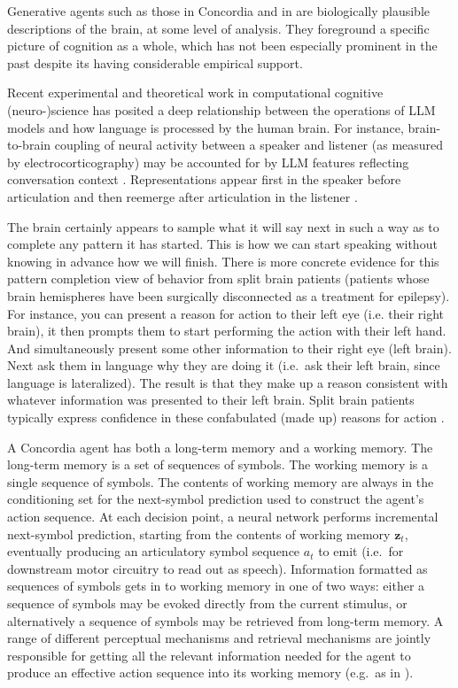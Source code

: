 \documentclass[11pt, a4paper, logo, twocolumn, internal, copyright, numbering]{googledeepmind}
\begin{document}
Generative agents such as those in Concordia and in \cite{park2023generative} are biologically plausible descriptions of the brain, at some level of analysis. They foreground a specific picture of cognition as a whole, which has not been especially prominent in the past despite its having considerable empirical support.

Recent experimental \citep{goldstein2022shared, schrimpf2020artificial} and theoretical \citep{linzen2021syntactic, mcclelland2020placing} work in computational cognitive (neuro-)science has posited a deep relationship between the operations of LLM models and how language is processed by the human brain. For instance, brain-to-brain coupling of neural activity between a speaker and listener (as measured by electrocorticography) may be accounted for by LLM features reflecting conversation context \citep{goldstein2022shared}. Representations appear first in the speaker before articulation and then reemerge after articulation in the listener \citep{zada2023shared}.

The brain certainly appears to sample what it will say next in such a way as to complete any pattern it has started. This is how we can start speaking without knowing in advance how we will finish. There is more concrete evidence for this pattern completion view of behavior from split brain patients (patients whose brain hemispheres have been surgically disconnected as a treatment for epilepsy). For instance, you can present a reason for action to their left eye (i.e. their right brain), it then prompts them to start performing the action with their left hand. And simultaneously present some other information to their right eye (left brain). Next ask them in language why they are doing it (i.e.~ask their left brain, since language is lateralized). The result is that they make up a reason consistent with whatever information was presented to their left brain. Split brain patients typically express confidence in these confabulated (made up) reasons for action \citep{roser2004automatic}.

A Concordia agent has both a long-term memory and a working memory. The long-term memory is a set of sequences of symbols. The working memory is a single sequence of symbols. The contents of working memory are always in the conditioning set for the next-symbol prediction used to construct the agent's action sequence. At each decision point, a neural network performs incremental next-symbol prediction, starting from the contents of working memory $\mathbf{z}_t$, eventually producing an articulatory symbol sequence $a_t$ to emit (i.e.~for downstream motor circuitry to read out as speech). Information formatted as sequences of symbols gets in to working memory in one of two ways: either a sequence of symbols may be evoked directly from the current stimulus, or alternatively a sequence of symbols may be retrieved from long-term memory. A range of different perceptual mechanisms and retrieval mechanisms are jointly responsible for getting all the relevant information needed for the agent to produce an effective action sequence into its working memory (e.g.~as in \cite{park2023generative}).
\end{document}
